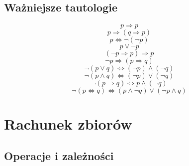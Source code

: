     \subsection{Ważniejsze tautologie}
        \begin{equation*}
            \tag{prawo tożsamości}
            p \Longrightarrow p
        \end{equation*}
        \begin{equation*}
            \tag{prawo symplifikacji}
            p \Longrightarrow (q \Longrightarrow p)
        \end{equation*}
        \begin{equation*}
            \tag{prawo podwójnej negacji}
            p \Leftrightarrow \neg(\neg p)
        \end{equation*}
        \begin{equation*}
            \tag{prawo wyłączonego środka}
            p \vee \neg p\end
        {equation*}
        \begin{equation*}
            (\neg p \Longrightarrow p) \Longrightarrow p
        \end{equation*}
        \begin{equation*}
            \tag{prawo Dunsa Szkota}
            \neg p \Longrightarrow (p \Longrightarrow q)
        \end{equation*}
        \begin{equation*}
            \tag{prawo De Morgana}
            \neg (p \vee q) \Leftrightarrow (\neg p) \wedge (\neg q)
        \end{equation*}
        \begin{equation*}
            \tag{prawo De Morgana}
            \neg (p \wedge q) \Leftrightarrow (\neg p) \vee (\neg q)
        \end{equation*}
        \begin{equation*}
            \neg(p \Longrightarrow q) \Leftrightarrow p \wedge (\neg q)
        \end{equation*}
        \begin{equation*}
            \neg(p \Leftrightarrow q) \Leftrightarrow (p \wedge \neg q) \vee (\neg p \wedge q)
        \end{equation*}

\section{Rachunek zbiorów}
    \subsection{Operacje i zależności}
